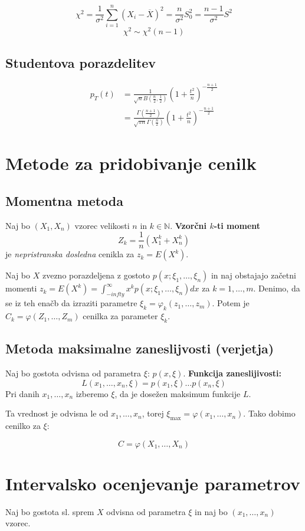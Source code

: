 \begin{multicols}{5}
\[ \chi^2 = \frac{1}{\sigma^2} \sum_{i=1}^{n} (X_i - \overline{X})^2 = \frac{n}{\sigma^2}S_0^2 = \frac{n-1}{\sigma^2}S^2\]
\[ \chi^2 \sim \chi^2(n-1)\]

\subsection{Studentova porazdelitev}
\begin{align*}
    p_T(t) &= \frac{1}{\sqrt{n} B(\frac{n}{2}, \frac{1}{2} )} \left(1 + \frac{t^2}{n}\right)^{-\frac{n+1}{2}} \\
    &= \frac{\Gamma(\frac{n+1}{2})}{\sqrt{\pi n} \Gamma(\frac{n}{2})} \left(1 + \frac{t^2}{n}\right)^{-\frac{n+1}{2}}
\end{align*}

\section{Metode za pridobivanje cenilk}
\subsection{Momentna metoda}
Naj bo $(X_1, X_n)$ vzorec velikosti $n$ in $k \in \mathbb{N}$.
\textbf{Vzorčni $k$-ti moment}
\[ Z_k = \frac{1}{n}\left( X_1^k + X_n^k \right)\]
je \textit{nepristranska dosledna} cenikla za $z_k = E(X^k)$.

Naj bo $X$ zvezno porazdeljena z gostoto $p(x; \xi_1, \dots, \xi_n)$ in naj obstajajo začetni momenti 
$z_k = E(X^k) = \int_{-infty}^{\infty} x^k p(x; \xi_1, \dots, \xi_n) dx$ za $k = 1, \dots, m$. Denimo, da se
iz teh enačb da izraziti parametre $\xi_k = \varphi_k(z_1, \dots, z_m)$. Potem je $C_k = \varphi(Z_1, \dots, Z_m)$ cenilka za parameter $\xi_k$.

\subsection{Metoda maksimalne zaneslijvosti (verjetja)}
Naj bo gostota odvisna od parametra $\xi$: $p(x, \xi)$.
\textbf{Funkcija zaneslijivosti:}
\[L(x_1, \dots, x_n, \xi) = p(x_1, \xi) \dots p(x_n, \xi)\]
Pri danih $x_1, \dots, x_n$ izberemo $\xi$, da je dosežen maksimum funkcije $L$.

Ta vrednost je odvisna le od $x_1, \dots, x_n$, torej $\xi_{\max} = \varphi(x_1, \dots, x_n)$. Tako dobimo cenilko za $\xi$:

\[ C = \varphi(X_1, \dots, X_n)\]

\section{Intervalsko ocenjevanje parametrov}
Naj bo gostota sl. sprem $X$ odvisna od parametra $\xi$ in naj bo $(x_1, \dots, x_n)$ vzorec.


\end{multicols}
